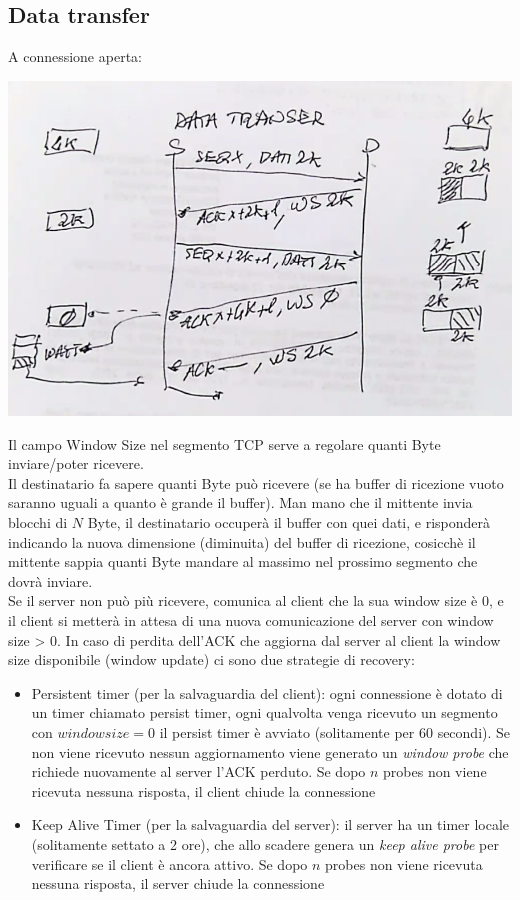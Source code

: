 \documentclass[11pt, oneside]{article}   	%
\begin{document}
\subsection*{Data transfer}
A connessione aperta:
\begin{center}
\includegraphics[scale=0.5]{t6}
\end{center}
Il campo Window Size nel segmento TCP serve a regolare quanti Byte inviare/poter ricevere.\\
Il destinatario fa sapere quanti Byte può ricevere (se ha buffer di ricezione vuoto saranno uguali a quanto è grande il buffer). Man mano che il mittente invia blocchi di $N$ Byte, il destinatario occuperà il buffer con quei dati, e risponderà indicando la nuova dimensione (diminuita) del buffer di ricezione, cosicchè il mittente sappia quanti Byte mandare al massimo nel prossimo segmento che dovrà inviare.\\
Se il server non può più ricevere, comunica al client che la sua window size è 0, e il client si metterà in attesa di una nuova comunicazione del server con window size > 0.
In caso di perdita dell'ACK che aggiorna dal server al client la window size disponibile (window update) ci sono due strategie di recovery:\begin{itemize}
\item Persistent timer (per la salvaguardia del client): ogni connessione è dotato di un timer chiamato persist timer, ogni qualvolta venga ricevuto un segmento con $window size = 0$ il persist timer è avviato (solitamente per 60 secondi). Se non viene ricevuto nessun aggiornamento viene generato un \emph{window probe} che richiede nuovamente al server l'ACK perduto. Se dopo $n$ probes non viene ricevuta nessuna risposta, il client chiude la connessione
\item Keep Alive Timer (per la salvaguardia del server): il server ha un timer locale (solitamente settato a 2 ore), che allo scadere genera un \emph{keep alive probe} per verificare se il client è ancora attivo. 
Se dopo $n$ probes non viene ricevuta nessuna risposta, il server chiude la connessione
\end{itemize}
\end{document}
